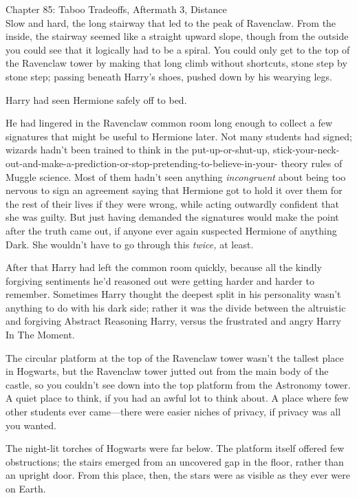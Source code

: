 
Chapter 85: Taboo Tradeoffs, Aftermath 3, Distance\\

Slow and hard, the long stairway that led to the peak of Ravenclaw. From the 
inside, the stairway seemed like a straight upward slope, though from the 
outside you could see that it logically had to be a spiral. You could only get 
to the top of the Ravenclaw tower by making that long climb without shortcuts, 
stone step by stone step; passing beneath Harry's shoes, pushed down by his 
wearying legs.

Harry had seen Hermione safely off to bed.

He had lingered in the Ravenclaw common room long enough to collect a few 
signatures that might be useful to Hermione later. Not many students had 
signed; wizards hadn't been trained to think in the put-up-or-shut-up, 
stick-your-neck-out-and-make-a-prediction-or-stop-pretending-to-believe-in-your-
theory rules of Muggle science. Most of them hadn't seen anything 
\emph{incongruent} about being too nervous to sign an agreement saying that 
Hermione got to hold it over them for the rest of their lives if they were 
wrong, while acting outwardly confident that she was guilty. But just having 
demanded the signatures would make the point after the truth came out, if 
anyone ever again suspected Hermione of anything Dark. She wouldn't have to go 
through this \emph{twice,} at least.

After that Harry had left the common room quickly, because all the kindly 
forgiving sentiments he'd reasoned out were getting harder and harder to 
remember. Sometimes Harry thought the deepest split in his personality wasn't 
anything to do with his dark side; rather it was the divide between the 
altruistic and forgiving Abstract Reasoning Harry, versus the frustrated and 
angry Harry In The Moment.

The circular platform at the top of the Ravenclaw tower wasn't the tallest 
place in Hogwarts, but the Ravenclaw tower jutted out from the main body of the 
castle, so you couldn't see down into the top platform from the Astronomy 
tower. A quiet place to think, if you had an awful lot to think about. A place 
where few other students ever came---there were easier niches of privacy, if 
privacy was all you wanted.

The night-lit torches of Hogwarts were far below. The platform itself offered 
few obstructions; the stairs emerged from an uncovered gap in the floor, rather 
than an upright door. From this place, then, the stars were as visible as they 
ever were on Earth.

